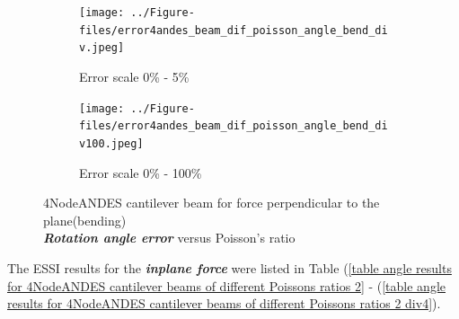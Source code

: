 \documentclass[fleqn,11pt]{article}
\begin{document}
\begin{figure}[H]
  \begin{subfigure}{0.5\textwidth}
    \centering
    \texttt{[image: ../Figure-files/error4andes\_beam\_dif\_poisson\_angle\_bend\_div.jpeg]}
    \caption{Error scale 0\% - 5\%}
  \end{subfigure}
  \begin{subfigure}{0.5\textwidth}
    \centering
    \texttt{[image: ../Figure-files/error4andes\_beam\_dif\_poisson\_angle\_bend\_div100.jpeg]}
    \caption{Error scale 0\% - 100\%}
  \end{subfigure}
  \captionsetup{justification=centering,margin=2cm}
  \caption{4NodeANDES cantilever beam for force perpendicular to the plane(bending)\\
      \emph{\textbf{Rotation angle error}}   versus   Poisson's ratio}
  \label{table angle error 4NodeANDES cantilever beam for different Poisson ratio}
\end{figure}











The ESSI results for the \textbf{\emph{inplane force}} were listed in Table (\ref{table angle results for 4NodeANDES cantilever beams of different Poissons ratios 2} - (\ref{table angle results for 4NodeANDES cantilever beams of different Poissons ratios 2 div4}). 
\end{document}
